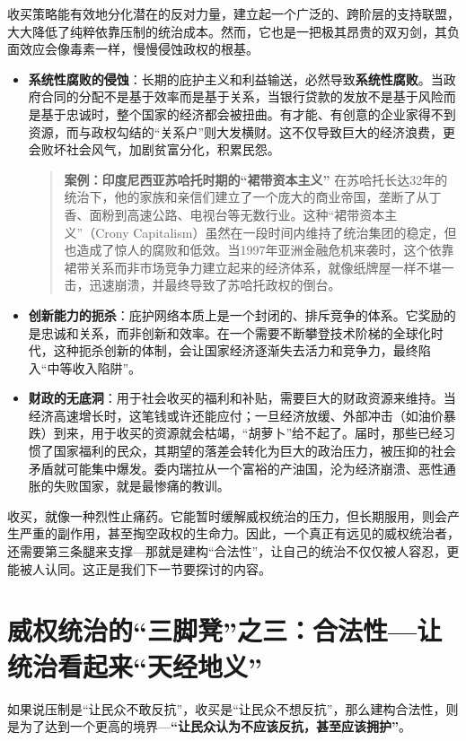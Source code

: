 收买策略能有效地分化潜在的反对力量，建立起一个广泛的、跨阶层的支持联盟，大大降低了纯粹依靠压制的统治成本。然而，它也是一把极其昂贵的双刃剑，其负面效应会像毒素一样，慢慢侵蚀政权的根基。

\begin{itemize}
    \item \textbf{系统性腐败的侵蚀}：长期的庇护主义和利益输送，必然导致\textbf{系统性腐败}。当政府合同的分配不是基于效率而是基于关系，当银行贷款的发放不是基于风险而是基于忠诚时，整个国家的经济都会被扭曲。有才能、有创意的企业家得不到资源，而与政权勾结的“关系户”则大发横财。这不仅导致巨大的经济浪费，更会败坏社会风气，加剧贫富分化，积累民怨。
    \begin{quote}
    \textbf{案例：印度尼西亚苏哈托时期的“裙带资本主义”}
    在苏哈托长达32年的统治下，他的家族和亲信们建立了一个庞大的商业帝国，垄断了从丁香、面粉到高速公路、电视台等无数行业。这种“裙带资本主义”（Crony Capitalism）虽然在一段时间内维持了统治集团的稳定，但也造成了惊人的腐败和低效。当1997年亚洲金融危机来袭时，这个依靠裙带关系而非市场竞争力建立起来的经济体系，就像纸牌屋一样不堪一击，迅速崩溃，并最终导致了苏哈托政权的倒台。
    \end{quote}
    \item \textbf{创新能力的扼杀}：庇护网络本质上是一个封闭的、排斥竞争的体系。它奖励的是忠诚和关系，而非创新和效率。在一个需要不断攀登技术阶梯的全球化时代，这种扼杀创新的体制，会让国家经济逐渐失去活力和竞争力，最终陷入“中等收入陷阱”。
    \item \textbf{财政的无底洞}：用于社会收买的福利和补贴，需要巨大的财政资源来维持。当经济高速增长时，这笔钱或许还能应付；一旦经济放缓、外部冲击（如油价暴跌）到来，用于收买的资源就会枯竭，“胡萝卜”给不起了。届时，那些已经习惯了国家福利的民众，其期望的落差会转化为巨大的政治压力，被压抑的社会矛盾就可能集中爆发。委内瑞拉从一个富裕的产油国，沦为经济崩溃、恶性通胀的失败国家，就是最惨痛的教训。
\end{itemize}

收买，就像一种烈性止痛药。它能暂时缓解威权统治的压力，但长期服用，则会产生严重的副作用，甚至掏空政权的生命力。因此，一个真正有远见的威权统治者，还需要第三条腿来支撑---那就是建构“合法性”，让自己的统治不仅仅被人容忍，更能被人认同。这正是我们下一节要探讨的内容。

\section{威权统治的“三脚凳”之三：合法性---让统治看起来“天经地义”}

如果说压制是“让民众不敢反抗”，收买是“让民众不想反抗”，那么建构合法性，则是为了达到一个更高的境界---\textbf{“让民众认为不应该反抗，甚至应该拥护”}。

